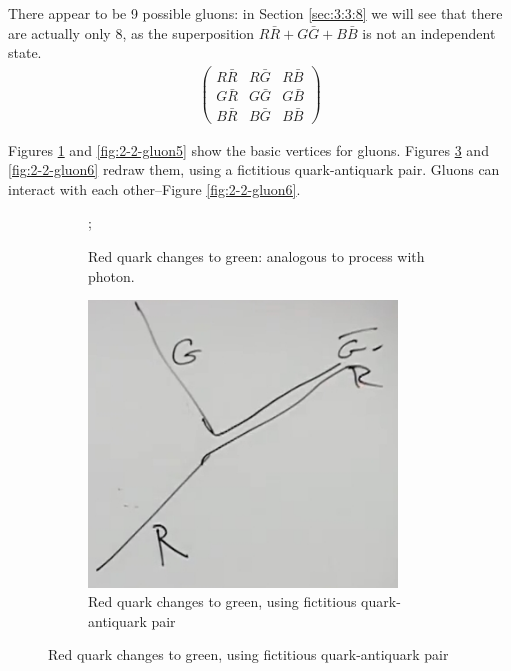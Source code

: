 \documentclass[]{article}
\begin{document}
There appear to be 9 possible gluons: in Section \ref{sec:3:3:8} we will see that there are actually only 8, as the superposition $R\bar{R}+G\bar{G}+B\bar{B}$ is not an independent state.
\begin{align*}
\begin{pmatrix}
R\bar{R}&R\bar{G}&R\bar{B}\\
G\bar{R}&G\bar{G}&G\bar{B}\\
B\bar{R}&B\bar{G}&B\bar{B}
\end{pmatrix}
\end{align*}

Figures \ref{fig:2-2-gluon3} and \ref{fig:2-2-gluon5} show the basic vertices for gluons. Figures \ref{fig:2-2-gluon4} and \ref{fig:2-2-gluon6} redraw them, using a fictitious quark-antiquark pair. Gluons can interact with each other--Figure \ref{fig:2-2-gluon6}.
\begin{figure}[H]
	\caption{The basic vertices of \gls{gls:QCD} -- Quarks}
	\begin{subfigure}[t]{0.45\textwidth}
		\caption{Red quark changes to green: analogous to process with photon.}\label{fig:2-2-gluon3}
		;
	\end{subfigure}
	\begin{subfigure}[t]{0.45\textwidth}
		\caption{Red quark changes to green, using fictitious quark-antiquark pair}
		\label{fig:2-2-gluon4}
		\includegraphics[width=0.9\textwidth]{2-2-gluon4}
	\end{subfigure}

\end{figure}
\end{document}
